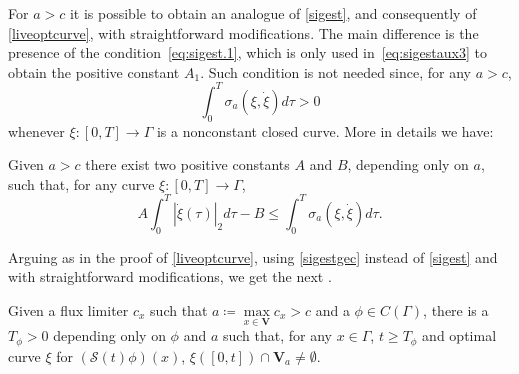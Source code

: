 \documentclass[11pt,a4paper,american]{article}
\newcommand{\Scal}{\mathcal S}
\newcommand{\Vbf}{\mathbf V}
\begin{document}
    For $a>c$ it is possible to obtain an analogue of \cref{sigest}, and consequently of \cref{liveoptcurve}, with straightforward modifications. The main difference is the presence of the condition~\cref{eq:sigest.1}, which is only used in~\cref{eq:sigestaux3} to obtain the positive constant $A_1$. Such condition is not needed since, for any $a>c$,
    \begin{equation*}
        \int_0^T\sigma_a\left(\xi,\dot\xi\right)d\tau>0
    \end{equation*}
    whenever $\xi:[0,T]\to\Gamma$ is a nonconstant closed curve. More in details we have:

    \begin{lem}\label{sigestgec}
        Given $a>c$ there exist two positive constants $A$ and $B$, depending only on $a$, such that, for any curve $\xi:[0,T]\to\Gamma$,
        \begin{equation*}
            A\int_0^T\left|\dot\xi(\tau)\right|_2d\tau-B\le\int_0^T\sigma_a\left(\xi,\dot\xi\right)d\tau.
        \end{equation*}
    \end{lem}

    Arguing as in the proof of \cref{liveoptcurve}, using \cref{sigestgec} instead of \cref{sigest} and with straightforward modifications, we get the next .

    \begin{lem}\label{supliveoptcurve}
        Given a flux limiter $c_x$ such that $a\coloneqq\max\limits_{x\in\Vbf}c_x>c$ and a $\phi\in C(\Gamma)$, there is a $T_\phi>0$ depending only on $\phi$ and $a$ such that, for any $x\in\Gamma$, $t\ge T_\phi$ and optimal curve $\xi$ for $(\Scal(t)\phi)(x)$, $\xi([0,t])\cap\Vbf_a\ne\emptyset$.
    \end{lem}

    \printbibliography[heading=bibintoc]
\end{document}
